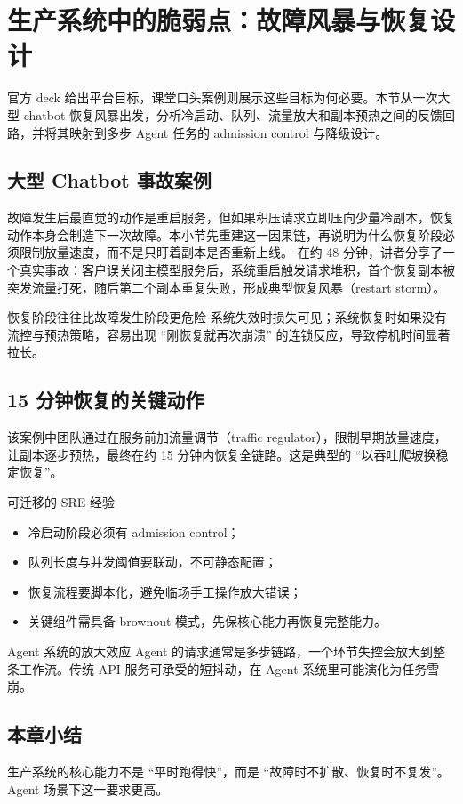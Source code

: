 \section{生产系统中的脆弱点：故障风暴与恢复设计}

官方 deck 给出平台目标，课堂口头案例则展示这些目标为何必要。本节从一次大型 chatbot 恢复风暴出发，分析冷启动、队列、流量放大和副本预热之间的反馈回路，并将其映射到多步 Agent 任务的 admission control 与降级设计。

\subsection{大型 Chatbot 事故案例}
故障发生后最直觉的动作是重启服务，但如果积压请求立即压向少量冷副本，恢复动作本身会制造下一次故障。本小节先重建这一因果链，再说明为什么恢复阶段必须限制放量速度，而不是只盯着副本是否重新上线。
在约 48 分钟，讲者分享了一个真实事故：客户误关闭主模型服务后，系统重启触发请求堆积，首个恢复副本被突发流量打死，随后第二个副本重复失败，形成典型恢复风暴（restart storm）。

\begin{importantbox}{恢复阶段往往比故障发生阶段更危险}
系统失效时损失可见；系统恢复时如果没有流控与预热策略，容易出现 ``刚恢复就再次崩溃'' 的连锁反应，导致停机时间显著拉长。
\end{importantbox}

\subsection{15 分钟恢复的关键动作}
该案例中团队通过在服务前加流量调节（traffic regulator），限制早期放量速度，让副本逐步预热，最终在约 15 分钟内恢复全链路。这是典型的 ``以吞吐爬坡换稳定恢复''。

\begin{knowledgebox}{可迁移的 SRE 经验}
\begin{itemize}
    \item 冷启动阶段必须有 admission control；
    \item 队列长度与并发阈值要联动，不可静态配置；
    \item 恢复流程要脚本化，避免临场手工操作放大错误；
    \item 关键组件需具备 brownout 模式，先保核心能力再恢复完整能力。
\end{itemize}
\end{knowledgebox}

\begin{warningbox}{Agent 系统的放大效应}
Agent 的请求通常是多步链路，一个环节失控会放大到整条工作流。传统 API 服务可承受的短抖动，在 Agent 系统里可能演化为任务雪崩。
\end{warningbox}

\subsection{本章小结}
生产系统的核心能力不是 ``平时跑得快''，而是 ``故障时不扩散、恢复时不复发''。Agent 场景下这一要求更高。

